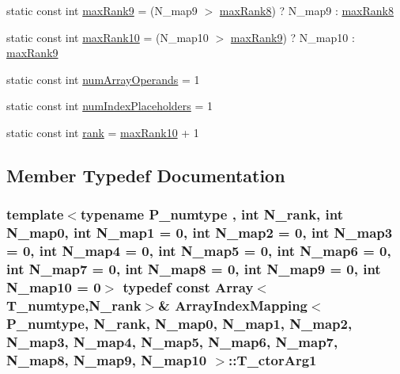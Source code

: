 \begin{DoxyCompactItemize}
\item 
static const int \hyperlink{classArrayIndexMapping_a8cfa29ef71a3141bec2f5a4463b80286}{max\+Rank9} = (N\+\_\+map9 $>$ \hyperlink{classArrayIndexMapping_a7fb0f9f1c04d24e03d050b60d29a5c68}{max\+Rank8}) ? N\+\_\+map9 \+: \hyperlink{classArrayIndexMapping_a7fb0f9f1c04d24e03d050b60d29a5c68}{max\+Rank8}
\item 
static const int \hyperlink{classArrayIndexMapping_a68ee816f5bdc86f1ab68826121af4362}{max\+Rank10} = (N\+\_\+map10 $>$ \hyperlink{classArrayIndexMapping_a8cfa29ef71a3141bec2f5a4463b80286}{max\+Rank9}) ? N\+\_\+map10 \+: \hyperlink{classArrayIndexMapping_a8cfa29ef71a3141bec2f5a4463b80286}{max\+Rank9}
\item 
static const int \hyperlink{classArrayIndexMapping_a0451e1373499ecee96a4f960927f1682}{num\+Array\+Operands} = 1
\item 
static const int \hyperlink{classArrayIndexMapping_a6e2238603bb36c0af24dcbced06e7500}{num\+Index\+Placeholders} = 1
\item 
static const int \hyperlink{classArrayIndexMapping_a1c77aabbe08df8e77c010ab6792db64a}{rank} = \hyperlink{classArrayIndexMapping_a68ee816f5bdc86f1ab68826121af4362}{max\+Rank10} + 1
\end{DoxyCompactItemize}


\subsection{Member Typedef Documentation}
\hypertarget{classArrayIndexMapping_ae416ca742eadc2243d3e13d4ee1b287c}{}
\subsubsection[{T\+\_\+ctor\+Arg1}]{\setlength{\rightskip}{0pt plus 5cm}template$<$typename P\+\_\+numtype , int N\+\_\+rank, int N\+\_\+map0, int N\+\_\+map1 = 0, int N\+\_\+map2 = 0, int N\+\_\+map3 = 0, int N\+\_\+map4 = 0, int N\+\_\+map5 = 0, int N\+\_\+map6 = 0, int N\+\_\+map7 = 0, int N\+\_\+map8 = 0, int N\+\_\+map9 = 0, int N\+\_\+map10 = 0$>$ typedef const {\bf Array}$<${\bf T\+\_\+numtype},N\+\_\+rank$>$\& {\bf Array\+Index\+Mapping}$<$ P\+\_\+numtype, N\+\_\+rank, N\+\_\+map0, N\+\_\+map1, N\+\_\+map2, N\+\_\+map3, N\+\_\+map4, N\+\_\+map5, N\+\_\+map6, N\+\_\+map7, N\+\_\+map8, N\+\_\+map9, N\+\_\+map10 $>$\+::{\bf T\+\_\+ctor\+Arg1}}\label{classArrayIndexMapping_ae416ca742eadc2243d3e13d4ee1b287c}
\hypertarget{classArrayIndexMapping_a075b000a9bf0680c71b6299c05d04124}{}
